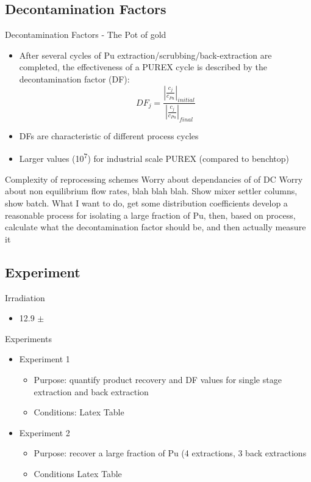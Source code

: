 \documentclass{beamer}
\newcommand{\tss}{\textsuperscript}
\begin{document}
\subsection{Decontamination Factors}
\begin{frame}{Decontamination Factors - The Pot of gold}
  \begin{itemize}
  \item{After several cycles of Pu extraction/scrubbing/back-extraction
    are completed, the effectiveness of a PUREX cycle is described
    by the decontamination factor (DF):}
    \begin{equation*}
      DF_j=\frac{\left|\frac{c_j}{c_{Pu}}\right|_{initial}}
      {\left|\frac{c_j}{c_{Pu}}\right|_{final}}
    \end{equation*}
  \item{DFs are characteristic of different process cycles}
  \item{Larger values (10\tss{7}) for industrial scale PUREX (compared
  to benchtop)\tss{\cite{stoller1961reactor,benedict1982nuclear}}}
  \end{itemize}
\end{frame}

\begin{frame}{Complexity of reprocessing schemes}
  Worry about dependancies of of DC
  Worry about non equilibrium
  flow rates, blah blah blah.
  Show mixer settler columns, show batch.
  What I want to do, get some distribution coefficients
  develop a reasonable process for isolating a large
  fraction of Pu, then, based on process, calculate what
  the decontamination factor should be, and then actually measure it
\end{frame}

\subsection{Experiment}
\begin{frame}{Irradiation}
  \begin{itemize}
  \item{12.9 $\pm$}
  \end{itemize}
\end{frame}

\begin{frame}{Experiments}
  \begin{itemize}
  \item{Experiment 1}
    \begin{itemize}
    \item{Purpose: quantify product recovery and DF values
      for single stage extraction and back extraction}
    \item{Conditions:}
      Latex Table
    \end{itemize}
  \item{Experiment 2}
    \begin{itemize}
    \item{Purpose: recover a large fraction of Pu (4 extractions,
      3 back extractions}
    \item{Conditions}
      Latex Table
    \end{itemize}
  \end{itemize}
\end{frame}
\end{document}
